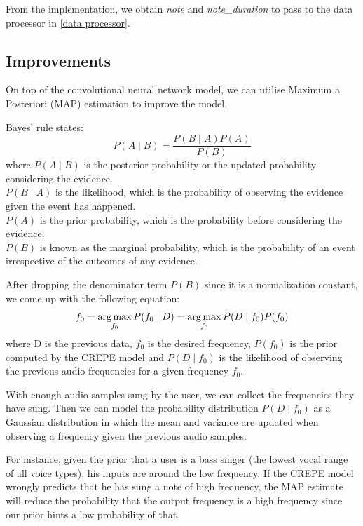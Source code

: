 From the implementation, we obtain \emph{note} and \emph{note\_duration} to pass to the data processor in \cref{data processor}.

\subsection{Improvements}

On top of the convolutional neural network model, we can utilise Maximum a Posteriori (MAP) estimation to improve the model.

Bayes' rule states: 
\[P(A\mid B)=\frac {P(B\mid A)P(A)}{P(B)}\]
where $P(A\mid B)$ is the posterior probability or the updated probability considering the evidence.\\
$P(B\mid A)$ is the likelihood, which is the probability of observing the evidence given the event has happened.\\
$P(A)$ is the prior probability, which is the probability before considering the evidence.\\
$P(B)$ is known as the marginal probability, which is the probability of an event irrespective of the outcomes of any evidence.

After dropping the denominator term $P(B)$ since it is a normalization constant, we come up with the following equation:
\[f_0 = \operatorname*{arg\,max}_{f_0} P({f_0}\mid D) = \operatorname*{arg\,max}_{f_0} P(D\mid {f_0}) P({f_0})\]
where D is the previous data, $f_0$ is the desired frequency, $P({f_0})$ is the prior computed by the CREPE model and $P(D\mid {f_0})$ is the likelihood
of observing the previous audio frequencies for a given frequency $f_0$.

With enough audio samples sung by the user, we can collect the frequencies they have sung. Then we can model the probability 
distribution $P(D\mid {f_0})$ as a Gaussian distribution in which the mean and variance are updated when observing a frequency given the previous audio samples. 

For instance, given the prior that a user is a bass singer (the lowest vocal range of all voice types), his inputs are around the low frequency. 
If the CREPE model wrongly predicts that he has sung a note of high frequency, the MAP estimate will reduce the probability that the output frequency is a high
frequency since our prior hints a low probability of that.

